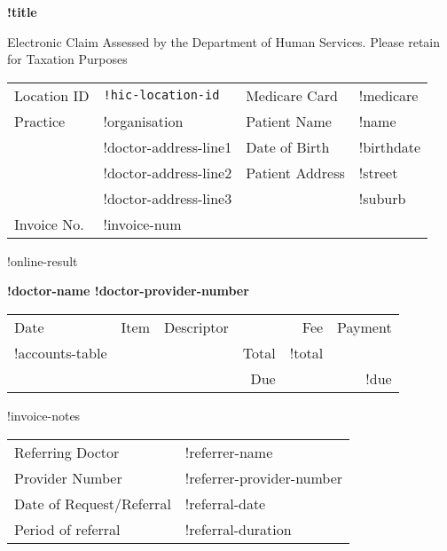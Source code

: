 \documentclass[12pt]{article}
\begin{document}
\begin{center}
{\bf \Large !title}

\vspace{3mm}

{\footnotesize Electronic Claim Assessed by the Department of Human Services. 
  Please retain for Taxation Purposes }

\end{center}

\vspace{8mm}

\begin{tabular}{llll}
  Location ID & \texttt{!hic-location-id} & Medicare Card & !medicare \\
  Practice & !organisation & Patient Name & !name \\
  & !doctor-address-line1 & Date of Birth & !birthdate \\
  & !doctor-address-line2 & Patient Address & !street \\
  & !doctor-address-line3 & & !suburb \\
 Invoice No. & !invoice-num & & \\
\end{tabular}

\vspace{3mm}

!online-result

\vspace{3mm}

{\bf !doctor-name !doctor-provider-number}

\vspace{3mm}

\begin{tabularx}{\textwidth}{llp{50mm}rrr}
Date & Item & Descriptor & & Fee & Payment \\ \cmidrule(l){1-6}
!accounts-table
\cmidrule(l){5-6}
& & & Total & !total  & \\
& & & Due & & !due \\
\end{tabularx}

!invoice-notes

\vspace{3mm}

\begin{tabular}{ll}
Referring Doctor & !referrer-name \\
Provider Number & !referrer-provider-number \\
Date of Request/Referral & !referral-date \\
Period of referral & !referral-duration \\
\end{tabular}
\end{document}
